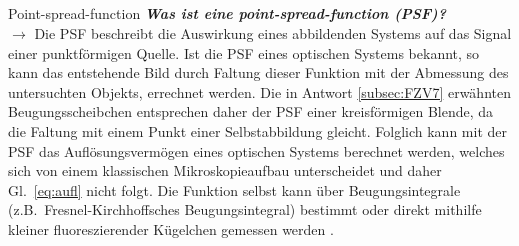 \subsection{}\label{subsec:FZV8}Point-spread-function
\textbf{\textit{Was ist eine point-spread-function (PSF)?}} \\
$\rightarrow$
Die PSF beschreibt die Auswirkung eines abbildenden Systems auf das Signal einer 
punktförmigen Quelle. Ist die PSF eines optischen Systems bekannt, so kann das 
entstehende Bild durch Faltung dieser Funktion mit der Abmessung des untersuchten 
Objekts, errechnet werden. Die in Antwort \ref{subsec:FZV7} erwähnten Beugungsscheibchen
entsprechen daher der PSF einer kreisförmigen Blende, da die Faltung mit einem Punkt einer 
Selbstabbildung gleicht. Folglich kann mit der PSF das Auflösungsvermögen eines optischen Systems 
berechnet werden, welches sich von einem klassischen Mikroskopieaufbau unterscheidet und 
daher Gl.~\eqref{eq:aufl} nicht folgt. 
Die Funktion selbst kann über Beugungsintegrale (z.B.~Fresnel-Kirchhoffsches Beugungsintegral)
bestimmt oder direkt mithilfe kleiner fluoreszierender Kügelchen gemessen werden \cite{Auf1, Auf2, Auf3}. \\ 
